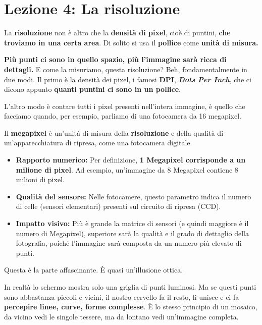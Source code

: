 \documentclass[
]{article}
\author{}
\date{}
\providecommand{\tightlist}{%
  \setlength{\itemsep}{0pt}\setlength{\parskip}{0pt}}
\begin{document}
\hypertarget{lezione-4-la-risoluzione}{%
\section{Lezione 4: La risoluzione}\label{lezione-4-la-risoluzione}}

La \textbf{risoluzione} non è altro che la \textbf{densità di pixel}, cioè di puntini, \textbf{che troviamo in una certa area}. Di solito si usa il \textbf{pollice} come \textbf{unità di misura.}

\textbf{Più punti ci sono in quello spazio, più l'immagine sarà ricca di dettagli.} E come la misuriamo, questa risoluzione? Beh, fondamentalmente in due modi. Il primo è la densità dei pixel, i famosi \textbf{DPI}, \textbf{\emph{Dots Per Inch}}, che ci dicono appunto \textbf{quanti puntini ci sono in un pollice}.

L'altro modo è contare tutti i pixel presenti nell'intera immagine, è quello che facciamo quando, per esempio, parliamo di una fotocamera da 16 megapixel.

Il \textbf{megapixel} è un'unità di misura della \textbf{risoluzione} e della qualità di un'apparecchiatura di ripresa, come una fotocamera digitale.

\begin{itemize}
\tightlist
\item
  \textbf{Rapporto numerico:} Per definizione, \textbf{1 Megapixel corrisponde a un milione di pixel}. Ad esempio, un'immagine da 8 Megapixel contiene 8 milioni di pixel.
\item
  \textbf{Qualità del sensore:} Nelle fotocamere, questo parametro indica il numero di celle (sensori elementari) presenti sul circuito di ripresa (CCD).
\item
  \textbf{Impatto visivo:} Più è grande la matrice di sensori (e quindi maggiore è il numero di Megapixel), superiore sarà la qualità e il grado di dettaglio della fotografia, poiché l'immagine sarà composta da un numero più elevato di punti.
\end{itemize}

Questa è la parte affascinante. È quasi un'illusione ottica.

In realtà lo schermo mostra solo una griglia di punti luminosi. Ma se questi punti sono abbastanza piccoli e vicini, il nostro cervello fa il resto, li unisce e ci fa \textbf{percepire linee, curve, forme complesse}. È lo stesso principio di un mosaico, da vicino vedi le singole tessere, ma da lontano vedi un'immagine completa.
\end{document}
